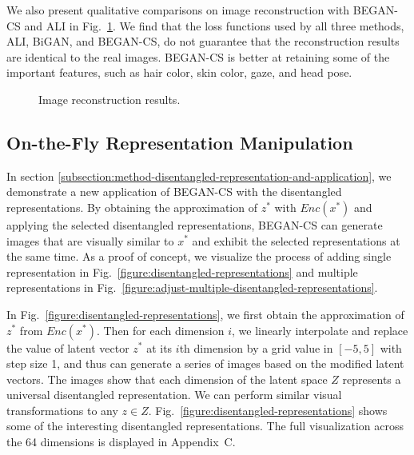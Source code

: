 \documentclass[runningheads]{llncs}
\begin{document}
    We also present qualitative comparisons on image reconstruction with BEGAN-CS and ALI in Fig.~\ref{Figure:Compare_With_ALI}. We find that the loss functions used by all three methods, ALI, BiGAN, and BEGAN-CS, do not guarantee that the reconstruction results are identical to the real images. BEGAN-CS is better at retaining some of the important features, such as hair color, skin color, gaze, and head pose.
    
    \begin{figure}[!t]
        \centering
        \setlength{\tabcolsep}{2pt}
        \caption{Image reconstruction results.}
        \label{Figure:Compare_With_ALI}
    \end{figure}
    
    
    
    \subsection{On-the-Fly Representation Manipulation}
    
    
    In section \ref{subsection:method-disentangled-representation-and-application}, we demonstrate a new application of BEGAN-CS with the disentangled representations. By obtaining the approximation of $z^*$ with $Enc(x^*)$ and applying  the selected disentangled representations, BEGAN-CS can generate images that are visually similar to $x^*$ and exhibit the selected representations at the same time. As a proof of concept, we visualize the process of adding single representation in Fig.~\ref{figure:disentangled-representations} and multiple representations in Fig.~\ref{figure:adjust-multiple-disentangled-representations}.
    
    In Fig.~\ref{figure:disentangled-representations}, we first obtain the approximation of $z^*$ from $Enc(x^*)$. Then for each dimension $i$, we linearly interpolate and replace the value of latent vector $z^*$ at its $i$th dimension by a grid value in $[-5, 5]$ with step size 1, and thus can generate a series of images based on the modified latent vectors. The images show that each dimension of the latent space $Z$ represents a universal disentangled representation. We can perform similar visual transformations to any $z \in Z$. Fig.~\ref{figure:disentangled-representations} shows some of the interesting disentangled representations. The full visualization across the 64 dimensions is displayed in Appendix~C.
    
\end{document}
